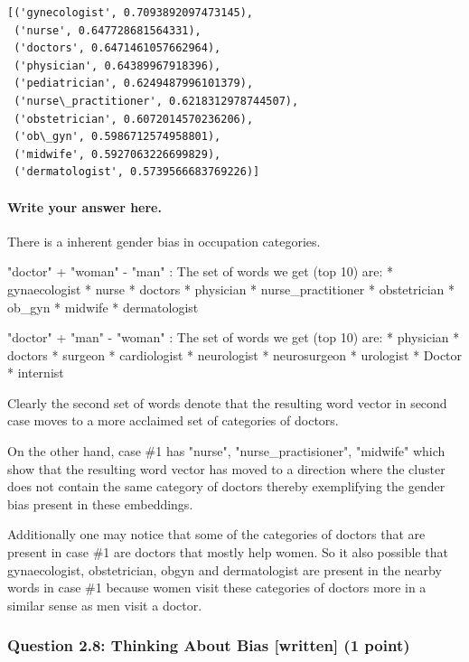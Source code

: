 \documentclass[11pt]{article}
\begin{document}
    \begin{Verbatim}[commandchars=\\\{\},fontsize=\footnotesize]
[('gynecologist', 0.7093892097473145),
 ('nurse', 0.647728681564331),
 ('doctors', 0.6471461057662964),
 ('physician', 0.64389967918396),
 ('pediatrician', 0.6249487996101379),
 ('nurse\_practitioner', 0.6218312978744507),
 ('obstetrician', 0.6072014570236206),
 ('ob\_gyn', 0.5986712574958801),
 ('midwife', 0.5927063226699829),
 ('dermatologist', 0.5739566683769226)]

    \end{Verbatim}

    \paragraph{Write your answer here.}\label{write-your-answer-here.}

There is a inherent gender bias in occupation categories.

"doctor" + "woman" - "man" : The set of words we get (top 10) are: *
gynaecologist * nurse * doctors * physician * nurse\_practitioner *
obstetrician * ob\_gyn * midwife * dermatologist

"doctor" + "man" - "woman" : The set of words we get (top 10) are: *
physician * doctors * surgeon * cardiologist * neurologist *
neurosurgeon * urologist * Doctor * internist

Clearly the second set of words denote that the resulting word vector in
second case moves to a more acclaimed set of categories of doctors.

On the other hand, case \#1 has "nurse", "nurse\_practisioner",
"midwife" which show that the resulting word vector has moved to a
direction where the cluster does not contain the same category of
doctors thereby exemplifying the gender bias present in these
embeddings.

Additionally one may notice that some of the categories of doctors that
are present in case \#1 are doctors that mostly help women. So it also
possible that gynaecologist, obstetrician, obgyn and dermatologist are
present in the nearby words in case \#1 because women visit these
categories of doctors more in a similar sense as men visit a doctor.

    \subsubsection{Question 2.8: Thinking About Bias {[}written{]} (1
point)}\label{question-2.8-thinking-about-bias-written-1-point}
\end{document}
